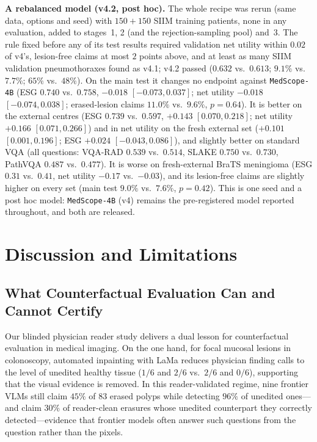 \documentclass[5p,times,twocolumn,authoryear]{elsarticle}
\begin{document}
\textbf{A rebalanced model (v4.2, post hoc).} The whole recipe was rerun (same data, options and seed) with $150 + 150$ SIIM training patients, none in any evaluation, added to stages~1, 2 (and the rejection-sampling pool) and~3. The rule fixed before any of its test results required validation net utility within $0.02$ of v4's, lesion-free claims at most $2$ points above, and at least as many SIIM validation pneumothoraxes found as v4.1; v4.2 passed ($0.632$ vs.\ $0.613$; $9.1\%$ vs.\ $7.7\%$; $65\%$ vs.\ $48\%$). On the main test it changes no endpoint against \texttt{MedScope-4B} (ESG $0.740$ vs.\ $0.758$, $-0.018$ $[-0.073, 0.037]$; net utility $-0.018$ $[-0.074, 0.038]$; erased-lesion claims $11.0\%$ vs.\ $9.6\%$, $p = 0.64$). It is better on the external centres (ESG $0.739$ vs.\ $0.597$, $+0.143$ $[0.070, 0.218]$; net utility $+0.166$ $[0.071, 0.266]$) and in net utility on the fresh external set ($+0.101$ $[0.001, 0.196]$; ESG $+0.024$ $[-0.043, 0.086]$), and slightly better on standard VQA (all questions: VQA-RAD $0.539$ vs.\ $0.514$, SLAKE $0.750$ vs.\ $0.730$, PathVQA $0.487$ vs.\ $0.477$). It is worse on fresh-external BraTS meningioma (ESG $0.31$ vs.\ $0.41$, net utility $-0.17$ vs.\ $-0.03$), and its lesion-free claims are slightly higher on every set (main test $9.0\%$ vs.\ $7.6\%$, $p = 0.42$). This is one seed and a post hoc model: \texttt{MedScope-4B} (v4) remains the pre-registered model reported throughout, and both are released.

\section{Discussion and Limitations}
\label{sec:discussion}

\subsection{What Counterfactual Evaluation Can and Cannot Certify}
\label{subsec:disc_certify}
Our blinded physician reader study delivers a dual lesson for counterfactual evaluation in medical imaging. On the one hand, for focal mucosal lesions in colonoscopy, automated inpainting with LaMa reduces physician finding calls to the level of unedited healthy tissue ($1/6$ and $2/6$ vs.\ $2/6$ and $0/6$), supporting that the visual evidence is removed. In this reader-validated regime, nine frontier VLMs still claim $45\%$ of $83$ erased polyps while detecting $96\%$ of unedited ones---and claim $30\%$ of reader-clean erasures whose unedited counterpart they correctly detected---evidence that frontier models often answer such questions from the question rather than the pixels.
\end{document}
